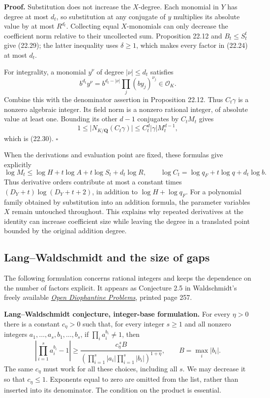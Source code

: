 \documentclass[
  11pt,
  a4paper,
]{article}
\begin{document}
\textbf{Proof.} Substitution does not increase the \(X\)-degree. Each
monomial in \(Y\) has degree at most \(d_t\), so substitution at any
conjugate of \(y\) multiplies its absolute value by at most \(R^{d_t}\).
Collecting equal \(X\)-monomials can only decrease the coefficient norm
relative to their uncollected sum. Proposition 22.12 and
\(B_t\le S_t^t\) give (22.29); the latter inequality uses
\(\delta\ge1\), which makes every factor in (22.24) at most \(d_t\).

For integrality, a monomial \(y^\nu\) of degree \(|\nu|\le d_t\)
satisfies \[
 b^{d_t}y^\nu=b^{d_t-|\nu|}\prod_j(by_j)^{\nu_j}\in\mathcal O_K.
\] Combine this with the denominator assertion in Proposition 22.12.
Thus \(C_t\gamma\) is a nonzero algebraic integer. Its field norm is a
nonzero rational integer, of absolute value at least one. Bounding its
other \(d-1\) conjugates by \(C_tM_t\) gives \[
 1\le\bigl|N_{K/\mathbf Q}(C_t\gamma)\bigr|
 \le C_t^d|\gamma|M_t^{d-1},
\] which is (22.30). \(\square\)

When the derivations and evaluation point are fixed, these formulas give
explicitly \[
 \log M_t\le\log H+t\log A+t\log S_t+d_t\log R,
 \qquad
 \log C_t=\log q_F+t\log q+d_t\log b.
 \tag{22.31}
\] Thus derivative orders contribute at most a constant times
\((D_Y+t)\log(D_Y+t+2)\), in addition to \(\log H+\log q_F\). For a
polynomial family obtained by substitution into an addition formula, the
parameter variables \(X\) remain untouched throughout. This explains why
repeated derivatives at the identity can increase coefficient size while
leaving the degree in a translated point bounded by the original
addition degree.

\subsection{Lang--Waldschmidt and the size of
gaps}\label{langwaldschmidt-and-the-size-of-gaps}

The following formulation concerns rational integers and keeps the
dependence on the number of factors explicit. It appears as Conjecture
2.5 in Waldschmidt's freely available
\href{https://webusers.imj-prg.fr/~michel.waldschmidt/articles/pdf/odp.pdf}{\emph{Open
Diophantine Problems}}, printed page 257.

\textbf{Lang--Waldschmidt conjecture, integer-base formulation.} For
every \(\eta>0\) there is a constant \(c_\eta>0\) such that, for every
integer \(s\ge1\) and all nonzero integers
\(a_1,\ldots,a_s,b_1,\ldots,b_s\), if \(\prod_i a_i^{b_i}\ne1\), then \[
 \left|\prod_{i=1}^s a_i^{b_i}-1\right|
 \ge
 \frac{c_\eta^{\,s}B}
 {\left(\prod_{i=1}^s|a_i|\prod_{i=1}^s|b_i|\right)^{1+\eta}},
 \qquad B=\max_i|b_i|.
 \tag{22.32}
\] The same \(c_\eta\) must work for all these choices, including all
\(s\). We may decrease it so that \(c_\eta\le1\). Exponents equal to
zero are omitted from the list, rather than inserted into its
denominator. The condition on the product is essential.
\end{document}
